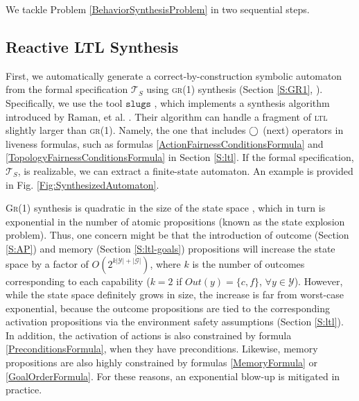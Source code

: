 
We tackle Problem \ref{BehaviorSynthesisProblem} in two sequential steps.

\subsection{Reactive LTL Synthesis}

First, we automatically generate a correct-by-construction symbolic automaton from the formal specification $\mathcal{T}_S$ using \textsc{gr(1)} synthesis (Section \ref{S:GR1}, \cite{Bloem2012GR1}).
Specifically, we use the tool $\mathtt{slugs}$ \cite{SLUGS}, which implements a synthesis algorithm introduced by Raman, et al. \cite{Vasu2013ICRA, Vasu2015TRO}.
Their algorithm can handle a fragment of \textsc{ltl} slightly larger than \textsc{gr(1)}.
Namely, the one that includes $\operatorname{\bigcirc}$ (next) operators in liveness formulas, such as formulas \eqref{ActionFairnessConditionsFormula} and \eqref{TopologyFairnessConditionsFormula} in Section \ref{S:ltl}.
If the formal specification, $\mathcal{T}_S$, is realizable, we can extract a finite-state automaton.
An example is provided in Fig. \ref{Fig:SynthesizedAutomaton}.

\textsc{Gr(1)} synthesis is quadratic in the size of the state space \cite{Bloem2012GR1}, which in turn is exponential in the number of atomic propositions (known as the state explosion problem).
Thus, one concern might be that the introduction of outcome (Section \ref{S:AP}) and memory (Section \ref{S:ltl-goals}) propositions will increase the state space by a factor of $O(2^{k | \mathcal{Y} | + | \mathcal{G} | })$, where $k$ is the number of outcomes corresponding to each capability ($k=2$ if $Out(y) = \{ c, f \}$, $\forall y \in \mathcal{Y}$).
However, while the state space definitely grows in size, the increase is far from worst-case exponential, because the outcome propositions are tied to the corresponding activation propositions via the environment safety assumptions (Section \ref{S:ltl}).
In addition, the activation of actions is also constrained by formula \eqref{PreconditionsFormula}, when they have preconditions.
Likewise, memory propositions are also highly constrained by formulas \eqref{MemoryFormula} or \eqref{GoalOrderFormula}.
For these reasons, an exponential blow-up is mitigated in practice.

